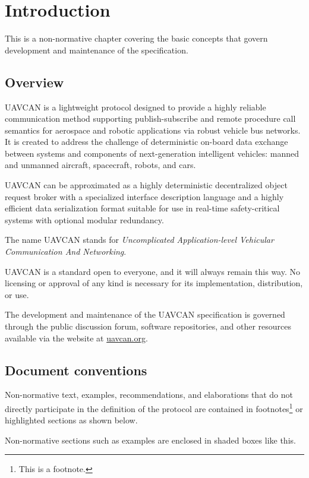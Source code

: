 \chapter{Introduction}\label{sec:introduction}

This is a non-normative chapter covering the basic concepts that govern development and maintenance of
the specification.

\section{Overview}

UAVCAN is a lightweight protocol designed to provide a highly reliable communication method
supporting publish-subscribe and remote procedure call semantics
for aerospace and robotic applications via robust vehicle bus networks.
It is created to address the challenge of deterministic on-board data exchange between systems and components
of next-generation intelligent vehicles: manned and unmanned aircraft, spacecraft, robots, and cars.

UAVCAN can be approximated as a highly deterministic decentralized object request broker
with a specialized interface description language and a highly efficient data serialization format
suitable for use in real-time safety-critical systems with optional modular redundancy.

The name UAVCAN stands for \emph{Uncomplicated Application-level Vehicular Communication And Networking}.

UAVCAN is a standard open to everyone, and it will always remain this way.
No licensing or approval of any kind is necessary for its implementation, distribution, or use.

The development and maintenance of the UAVCAN specification is governed through the public discussion forum,
software repositories, and other resources available via the website at \href{http://uavcan.org}{uavcan.org}.

\section{Document conventions}

Non-normative text, examples, recommendations, and elaborations that do not directly participate
in the definition of the protocol are contained in footnotes\footnote{This is a footnote.}
or highlighted sections as shown below.

\begin{remark}
    Non-normative sections such as examples are enclosed in shaded boxes like this.
\end{remark}

